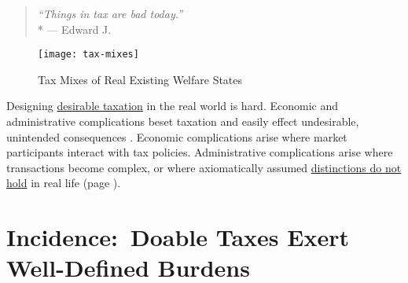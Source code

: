 


\begin{quote}
	\emph{``Things in tax are bad today.''}
	\\*
	--- Edward J.\ \citet[893]{McCaffery2005}
\end{quote}


 \begin{figure}[htbp]
	\centering
	\texttt{[image: tax-mixes]}
	\caption[Tax Mixes]{Tax Mixes of Real Existing Welfare States}
	\label{fig:tax-mixes}
\end{figure}


Designing \hyperref[sec:Desirability]{desirable taxation} in the real world is hard.
Economic and administrative complications beset taxation and easily effect undesirable, unintended consequences \citep{Merton-1968-aa}.
Economic complications arise where market participants interact with tax policies.
Administrative complications arise where transactions become complex, or where axiomatically assumed \hyperref[sec:WorkPlay]{distinctions do not hold} in real life (page \pageref{sec:WorkPlay}).

\section[Incidence]{Incidence:~Doable Taxes Exert Well-Defined Burdens} \label{sec:tax-incidence}



